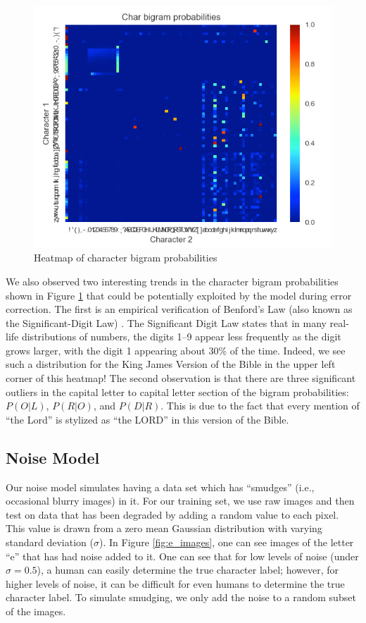 \documentclass[10pt,twocolumn,letterpaper]{article}
\begin{document}
\begin{figure}
\includegraphics[scale=.45]{24272959_889664494543135_1476429274_n.png}
\caption{Heatmap of character bigram probabilities}
\label{fig:bigram_heatmap}
\end{figure}

We also observed two interesting trends in the character bigram probabilities shown in Figure \ref{fig:bigram_heatmap}
that could be potentially exploited by the model during error correction.
The first is an empirical verification of Benford's Law (also known as
the Significant-Digit Law) \cite{Hill95-ASD}. The Significant Digit Law states
that in many real-life distributions of numbers, the digits 1--9 appear less
frequently as the digit grows larger, with the digit 1 appearing about
$30\%$ of the time. Indeed, we see such a distribution for the King James
Version of the Bible in the upper left corner of this heatmap! The
second observation is that there are three significant outliers in the
capital letter to capital letter section of the bigram probabilities:
$P(O | L)$, $P(R | O)$, and $P(D | R)$. This is due to the fact that every
mention of ``the Lord'' is stylized as ``the LORD'' in this version of the
Bible.

\subsection{Noise Model}
Our noise model simulates having a data set which has ``smudges'' (i.e.,
occasional blurry images) in it. For our training set, we use raw images and
then test on data that has been degraded by adding a random value to each
pixel. This value is drawn from a zero mean Gaussian distribution with
varying standard deviation ($\sigma$).  In Figure \ref{fig:e_images}, one can see
images of the letter ``e'' that has had noise added to it. One can see
that for low levels of noise (under $\sigma = 0.5$), a human can easily
determine the true character label; however, for higher levels of noise,
it can be difficult for even humans to determine the true character label.
To simulate smudging, we only add the noise to a random subset of the images.
\end{document}
